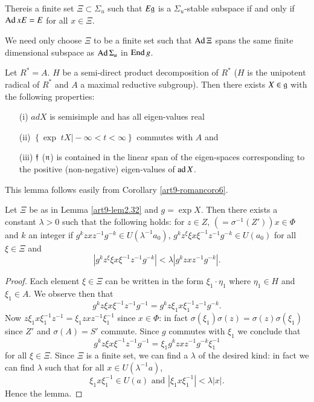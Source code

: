 \setcounter{lemma}{31}
\begin{lemma}\label{art9-lem2.32}
There\pageoriginale is a finite set $\Xi \subset \Sigma_u$ such that $E \mathfrak{g}$ is a $\Sigma_u$-stable subspace if and only if $\operatorname{Ad} x E= E$ for all $x \in \Xi$.
\end{lemma}

We need only choose $\Xi$ to be a finite set such that $\operatorname{Ad} \Xi$ spans the same finite dimensional subspace as $\operatorname{Ad} \Sigma_u$ in $\operatorname{End} g$.

\begin{lemma}\label{art9-lem2.33}
Let  $R^\ast = A$. $H$ be a semi-direct product decomposition of $R^\ast$ ($H$ is the unipotent radical of $R^\ast$ and $A$ a maximal reductive subgroup). Then there exists $X \in \mathfrak{g}$ with the following properties:
\begin{itemize}
\item[(i)] $ad X$ is semisimple and has all eigen-values real 

\item[(ii)] $\left\{\exp \; t X \big| - \infty < t < \infty  \right\}$ commutes with $A$ and

\item[(iii)] $\mathfrak{f}$ (\resp $\mathfrak{n}$) is contained in the linear span of the eigen-spaces corresponding to the positive (\resp non-negative) eigen-values of $\operatorname{ad} X$.
\end{itemize}
\end{lemma}

This lemma follows easily from Corollary \ref{art9-romancoro6}.

\begin{lemma}\label{art9-lem2.34}
Let $\Xi$ be as in Lemma \ref{art9-lem2.32} and $g = \exp X$. Then there exists a constant $\lambda > 0$ such that the following holds: for $z \in Z$, $(= \sigma^{-1} (Z')) x \in \Phi$ and $k$ an integer if $g^k z x z^{-1} g^{-k} \in U (\lambda^{-1} a_0)$, $g^k z^\xi \xi x \xi^{-1} z^{-1} g^{-k} \in U(a_0)$ for all $\xi \in \Xi$ and
$$
|g^k z^\xi \xi x \xi^{-1} z^{-1} g^{-k}| < \lambda | g^k z x z^{-1} g^{-k} |.
$$
\end{lemma}

\begin{proof}
Each element $\xi \in \Xi$ can be written in the form $\xi_1 \cdot \eta_1$ where $\eta_1 \in H$ and $\xi_1 \in A$. We observe then that 
$$
g^k z \xi x \xi^{-1} z^{-1} g^{-1} = g^k z \xi_1 x \xi^{-1}_1 z^{-1}g^{-k}.
$$
Now $z \xi_1 x \xi^{-1}_1 z^{-1} = \xi_1 z x z^{-1} \xi^{-1}_1$ since $x \in \Phi$: in fact $\sigma (\xi_1) \sigma (z) = \sigma (z) \sigma(\xi_1)$ since $Z'$ and $\sigma(A) = S'$ commute. Since $g$ commutes with $\xi_1$ we conclude that
$$
g^k z \xi x \xi^{-1} z^{-1} g^{-1} = \xi_1 g^k z x z^{-1} g^{-k} \xi^{-1}_1
$$
for all $\xi \in \Xi$. Since $\Xi$ is a finite set, we can find a $\lambda$ of the desired kind: in fact we can find $\lambda$ such that for all $x \in U (\lambda^{-1} a)$,
$$
\xi_1 x \xi^{-1}_1 \in U(a) \text{ and }  |\xi_1 x \xi^{-1}_1| < \lambda |x|.
$$
Hence the lemma.
\end{proof}

